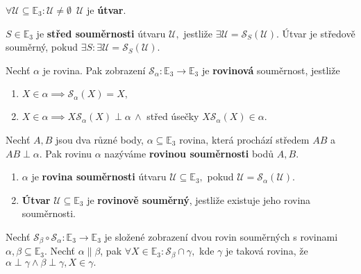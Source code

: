 \begin{definition}
    $\forall \mathscr U \subseteq \mathbb E_3: \mathscr U\ne \emptyset \,\,\, \mathscr
    U$ je \textbf{útvar}.
\end{definition}

\begin{definition}
    $S\in \mathbb E_3$ je \textbf{střed souměrnosti} útvaru $\mathscr U,$ jestliže
    $\exists \mathscr U = \mathscr S_S(\mathscr U).$ Útvar je středově souměrný,
    pokud $\exists S:\exists\mathscr U = \mathscr S_S(\mathscr U).$
\end{definition}

\begin{definition}
    Nechť $\alpha$ je rovina. Pak zobrazení $\mathscr S_\alpha:\mathbb E_3 \to
    \mathbb E_3$ je \textbf{rovinová}  souměrnost, jestliže
    \begin{enumerate}[$i.$]
    \item $X\in\alpha\implies \mathscr S_\alpha(X)=X,$
   	\item $X\in\alpha\implies X\mathscr S_\alpha(X) \perp\alpha\,\land$ střed úsečky
    $X\mathscr S_\alpha(X)\in \alpha.$
    \end{enumerate}
\end{definition}

\begin{definition}
    Nechť $A,B$ jsou dva různé body, $\alpha \subseteq \mathbb E_3$ rovina, která
    prochází středem $AB$ a $AB\perp \alpha$. Pak rovinu $\alpha$ nazýváme
    \textbf{rovinou souměrnosti} bodů $A,B.$
\end{definition}

\begin{definition}
\begin{enumerate}[$i.$]
\item $\alpha$ je \textbf{rovina souměrnosti} útvaru $\mathscr U\subseteq \mathbb E_3,$
pokud $\mathscr U = \mathscr S_\alpha(\mathscr U).$
\item \textbf{Útvar} $\mathscr U \subseteq \mathbb E_3$ je \textbf{rovinově souměrný},
jestliže existuje jeho rovina souměrnosti.
\end{enumerate}
\end{definition}

\begin{veta}
    Nechť $\mathscr S_\beta \circ \mathscr S_\alpha: \mathbb E_3 \to \mathbb E_3$ je
    složené zobrazení dvou rovin souměrných s rovinami $\alpha, \beta\subseteq \mathbb
    E_3$. Nechť $\alpha \parallel \beta$, pak $\forall X\in \mathbb E_3: \mathscr
    S_\beta \cap \gamma,$ kde $\gamma$ je taková rovina, že $\alpha \perp \gamma \land
    \beta \perp \gamma, X \in \gamma.$
\end{veta}

